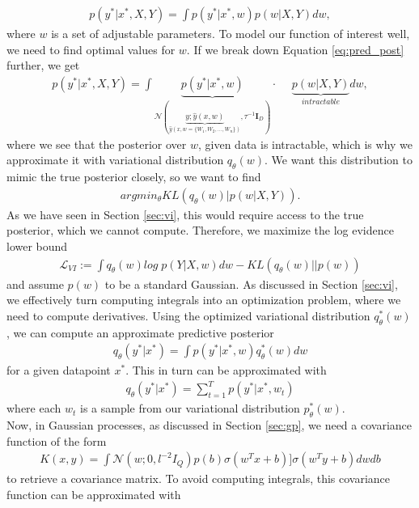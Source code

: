 \documentclass[a4paper,cleardoubleempty,BCOR1cm, 11pt]{report}
\begin{document}
\begin{align}\label{eq:pred_post}
 p(y^*|x^*, X,Y) = \int p(y^*|x^*, w)p(w|X,Y)dw,
\end{align}
where $w$ is a set of adjustable parameters. To model our function of interest well, we need to find optimal values for $w$. If we break down Equation \ref{eq:pred_post} further, we get
\begin{align}
p(y^*|x^*, X,Y) = \int \underbrace{p(y^*|x^*,w)}_{\mathcal{N}(\underbrace{y;\hat{y}(x,w)}_{\hat{y}(x, w=\lbrace W_1, W_2,...,W_n\rbrace)},\tau^{-1}\mathbf{I}_D)} \cdot \hspace{15pt}\underbrace{p(w|X,Y)}_{intractable}dw,
\end{align}
where we see that the posterior over $w$, given data is intractable, which is why we approximate it with variational distribution $q_{\theta}(w)$. We want this distribution to mimic the true posterior closely, so we want to find
\begin{align*}
	argmin_{\theta} KL(q_{\theta}(w)|p(w|X,Y)).
\end{align*}
As we have seen in Section \ref{sec:vi}, this would require access to the true posterior, which we cannot compute. Therefore, we maximize the log evidence lower bound
\begin{align*}
\mathcal{L}_{VI} := \int q_{\theta}(w) log\;p (Y|X, w)dw - KL(q_{\theta}(w)||p(w))
\end{align*}
and assume $p(w)$ to be a standard Gaussian. As discussed in Section \ref{sec:vi}, we effectively turn computing integrals into an optimization problem, where we need to compute derivatives. Using the optimized variational distribution $q_{\theta}^*(w)$, we can compute an approximate predictive posterior 
\begin{align*}
q_{\theta}(y^*|x^*) = \int p(y^*|x^*, w)q_{\theta}^*(w)dw
\end{align*}
for a given datapoint $x^*$. This in turn can be approximated with
\begin{align*}
q_{\theta}(y^*|x^*) = \sum_{t=1}^{T}p(y^*|x^*, w_t)
\end{align*}
where each $w_t$ is a sample from our variational distribution $p_{\theta}^*(w)$.
\\
Now, in Gaussian processes, as discussed in Section \ref{sec:gp}, we need a covariance function of the form 
\begin{align*}
K(x,y) = \int \mathcal{N}(w;0, l^{-2} I_Q)p(b)\sigma(w^Tx+b)]\sigma(w^Ty +b)dwdb
\end{align*}
to retrieve a covariance matrix. To avoid computing integrals, this covariance function can be approximated with
\end{document}

